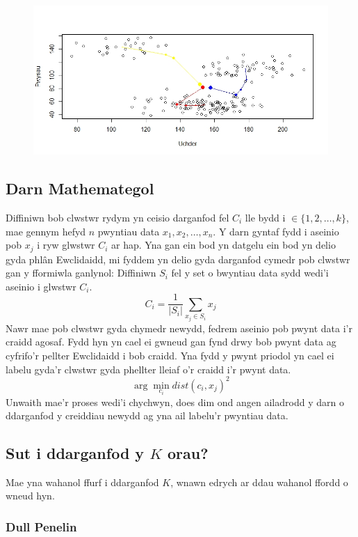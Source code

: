 \begin{enumerate}
\begin{figure}[H]
\begin{center}
\includegraphics[width=0.5\linewidth]{../img/Convergence4.jpeg}
\end{center}
\end{figure}

\end{enumerate}  

\subsection{Darn Mathemategol}

Diffiniwn bob clwstwr rydym yn ceisio darganfod fel $C_i$ lle bydd i $\in \{ 1, 2, \dots, k\}$, mae gennym hefyd $n$ pwyntiau data $x_1,x_2,\dots,x_n$. Y darn gyntaf fydd i aseinio pob $x_j$ i ryw glwstwr $C_i$ ar hap. Yna gan ein bod yn datgelu ein bod yn delio gyda phl\^{a}n Ewclidaidd, mi fyddem yn delio gyda darganfod cymedr pob clwstwr gan y fformiwla ganlynol:
Diffiniwn $S_i$ fel y set o bwyntiau data sydd wedi'i aseinio i glwstwr $C_i$.
$$ C_i = \frac{1}{|S_i|}\sum_{x_j \in S_i} {x_j} $$
Nawr mae pob clwstwr gyda chymedr newydd, fedrem aseinio pob pwynt data i'r craidd agosaf. Fydd hyn yn cael ei gwneud gan fynd drwy bob pwynt data ag cyfrifo'r pellter Ewclidaidd i bob craidd. Yna fydd y pwynt priodol yn cael ei labelu gyda'r clwstwr gyda phellter lleiaf o'r craidd i'r pwynt data.
$$ \arg \min_{c_i} dist(c_i,x_j)^2$$
Unwaith mae'r proses wedi'i chychwyn, does dim ond angen ailadrodd y darn o ddarganfod y creiddiau newydd ag yna ail labelu'r pwyntiau data.


\subsection{Sut i ddarganfod y $K$ orau?}

Mae yna wahanol ffurf i ddarganfod $K$, wnawn edrych ar ddau wahanol ffordd o wneud hyn. 

\subsubsection{Dull Penelin}


